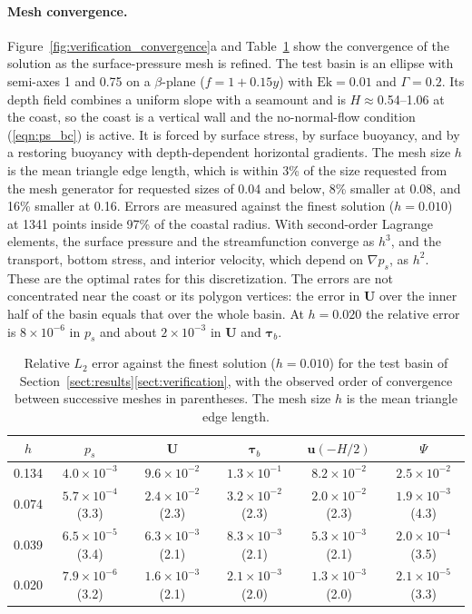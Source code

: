 \documentclass{ametsocV6.2}
\begin{document}
\paragraph{Mesh convergence.}
Figure~\ref{fig:verification_convergence}a and Table~\ref{tab:mesh_convergence} show the convergence of the solution as the surface-pressure mesh is refined.
The test basin is an ellipse with semi-axes 1 and 0.75 on a $\beta$-plane ($f = 1 + 0.15y$) with $\mathrm{Ek} = 0.01$ and $\Gamma = 0.2$.
Its depth field combines a uniform slope with a seamount and is $H \approx $0.54--1.06 at the coast, so the coast is a vertical wall and the no-normal-flow condition (\ref{eqn:ps_bc}) is active.
It is forced by surface stress, by surface buoyancy, and by a restoring buoyancy with depth-dependent horizontal gradients.
The mesh size $h$ is the mean triangle edge length, which is within 3\% of the size requested from the mesh generator for requested sizes of 0.04 and below, 8\% smaller at 0.08, and 16\% smaller at 0.16.
Errors are measured against the finest solution ($h = 0.010$) at 1341 points inside 97\% of the coastal radius.
With second-order Lagrange elements, the surface pressure and the streamfunction converge as $h^3$, and the transport, bottom stress, and interior velocity, which depend on $\nabla p_s$, as $h^2$.
These are the optimal rates for this discretization.
The errors are not concentrated near the coast or its polygon vertices: the error in $\mathbf{U}$ over the inner half of the basin equals that over the whole basin.
At $h = 0.020$ the relative error is $8 \times 10^{-6}$ in $p_s$ and about $2 \times 10^{-3}$ in $\mathbf{U}$ and $\boldsymbol{\tau}_b$.

\begin{table}
\centering
\begin{tabular}{cccccc}
\hline
$h$ & $p_s$ & $\mathbf{U}$ & $\boldsymbol{\tau}_b$ & $\mathbf{u}(-H/2)$ & $\Psi$ \\
\hline
0.134 & $4.0 \times 10^{-3}$ & $9.6 \times 10^{-2}$ & $1.3 \times 10^{-1}$ & $8.2 \times 10^{-2}$ & $2.5 \times 10^{-2}$ \\
0.074 & $5.7 \times 10^{-4}$ (3.3) & $2.4 \times 10^{-2}$ (2.3) & $3.2 \times 10^{-2}$ (2.3) & $2.0 \times 10^{-2}$ (2.3) & $1.9 \times 10^{-3}$ (4.3) \\
0.039 & $6.5 \times 10^{-5}$ (3.4) & $6.3 \times 10^{-3}$ (2.1) & $8.3 \times 10^{-3}$ (2.1) & $5.3 \times 10^{-3}$ (2.1) & $2.0 \times 10^{-4}$ (3.5) \\
0.020 & $7.9 \times 10^{-6}$ (3.2) & $1.6 \times 10^{-3}$ (2.1) & $2.1 \times 10^{-3}$ (2.0) & $1.3 \times 10^{-3}$ (2.0) & $2.1 \times 10^{-5}$ (3.3) \\
\hline
\end{tabular}
\vspace{6pt}
\caption{\label{tab:mesh_convergence} Relative $L_2$ error against the finest solution ($h = 0.010$) for the test basin of Section~\ref{sect:results}\ref{sect:verification}, with the observed order of convergence between successive meshes in parentheses. The mesh size $h$ is the mean triangle edge length.}
\end{table}
\end{document}

